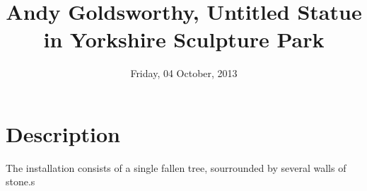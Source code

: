 \documentclass[11pt, a4paper, oneside]{article}
\title{Andy Goldsworthy, Untitled Statue in Yorkshire Sculpture Park}
\begin{document}
\date{Friday, 04 October, 2013}
\maketitle
\section{Description}
The installation consists of a single fallen tree, sourrounded by several walls of stone.s
\end{document}
